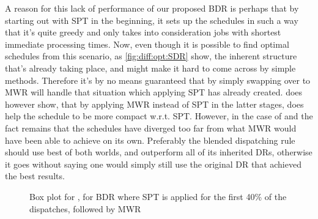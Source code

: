 A reason for this lack of performance of our proposed BDR is perhaps that by starting out with SPT in the beginning, it sets up the schedules in such a way that it's quite greedy and only takes into consideration jobs with shortest immediate processing times. Now, even though it is possible to find optimal schedules from this scenario, as \cref{fig:diff:opt:SDR} show, the inherent structure that's already taking place, and might make it hard to come across by simple methods. Therefore it's by no means guaranteed that by simply swapping over to MWR will handle that situation which applying SPT has already created.  does however show, that by applying MWR instead of SPT in the latter stages, does help the schedule to be more compact w.r.t. SPT. However, in the case of  and  the fact remains that the schedules have diverged too far from what MWR would have been able to achieve on its own. Preferably the blended dispatching rule should use  best of both worlds, and outperform all of its inherited DRs, otherwise it goes without saying one would simply still use the original DR that achieved the best results.

\begin{figure}
\centering
{}
\caption{Box plot for \namerho, for BDR where SPT is applied for the first 40\% of the dispatches, followed by MWR}
\label{fig:diff:boxplot:BDR}
\end{figure}


